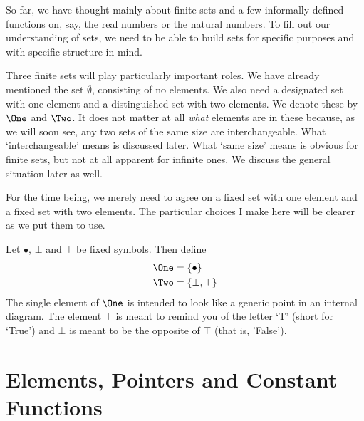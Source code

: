 So far, we have thought mainly about finite sets and a few informally defined functions on, say, the real numbers or the natural numbers.
To fill out our understanding of sets, we need to be able to build sets for specific purposes and with specific structure in mind. 

Three finite sets will play particularly important roles. We have already mentioned the set $\emptyset$, consisting of no elements.
We also need a designated set with one element and a distinguished set with two elements. We denote these by $\One$ and $\Two$. 
It does not matter at all \emph{what} elements are in these because, as we will soon see, any two sets of the same size are interchangeable.
What `interchangeable' means is discussed later.
What `same size' means is obvious for finite sets, but not at all apparent for infinite ones.
We discuss the general situation later as well.

For the time being, we merely need to agree on a fixed set with one element and a fixed set with two elements.
The particular choices I make here will be clearer as we put them to use.

\begin{defn}
	Let $\bullet$, $\bot$ and $\top$ be fixed symbols. Then define
	\begin{align*}
		\One &= \{\bullet\}\\
		\Two &= \{\bot,\top\}
	\end{align*} 
	The single element of $\One$ is intended to look like a generic point in an internal diagram.
	The element $\top$ is meant to remind you of the letter `T' (short for `True') and $\bot$ is meant to be the opposite of $\top$ (that is, 'False').
\end{defn}


\section{Elements, Pointers and Constant Functions}

